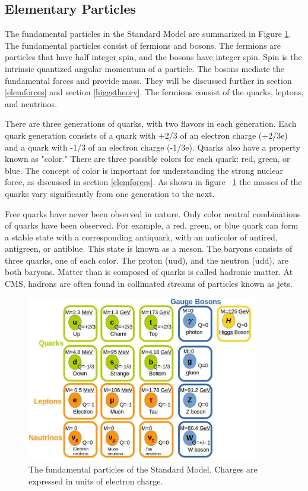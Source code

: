 \documentclass[oneside, letterpaper, oldfontcommands]{memoir}
\begin{document}
\subsection{Elementary Particles}\label{elemparticles}
\qquad The fundamental particles in the Standard Model are summarized in Figure \ref{fig:SMParticles}. The fundamental particles consist of fermions and bosons. The fermions are particles that have half integer spin, and the bosons have integer spin. Spin is the intrinsic quantized angular momentum of a particle. The bosons mediate the fundamental forces and provide mass. They will be discussed further in section \ref{elemforces} and section \ref{higgstheory}. The fermions consist of the quarks, leptons, and neutrinos. 

\qquad There are three generations of quarks, with two flavors in each generation. Each quark generation consists of a quark with +2/3 of an electron charge (+2/3e) and a quark with -1/3 of an electron charge (-1/3e). Quarks also have a property known as "color." There are three possible colors for each quark: red, green, or blue. The concept of color is important for understanding the strong nuclear force, as discussed in section \ref{elemforces}. As shown in figure ~\ref{fig:SMParticles} the masses of the quarks vary significantly from one generation to the next.

\qquad Free quarks have never been observed in nature. Only color neutral combinations of quarks have been observed. For example, a red, green, or blue quark can form a stable state with a corresponding antiquark, with an anticolor of antired, antigreen, or antiblue. This state is known as a meson. The baryons consists of three quarks, one of each color. The proton (uud), and the neutron (udd), are both baryons. Matter than is composed of quarks is called hadronic matter. At CMS, hadrons are often found in collimated streams of particles known as jets. 

\begin{figure}[here]
\includegraphics[width=0.9\textwidth]{StandardModel.pdf}
\caption{The fundamental particles of the Standard Model. Charges are expressed in units of electron charge.\cite{Agashe:2014kda} }
\label{fig:SMParticles}
\end{figure}
\end{document}
